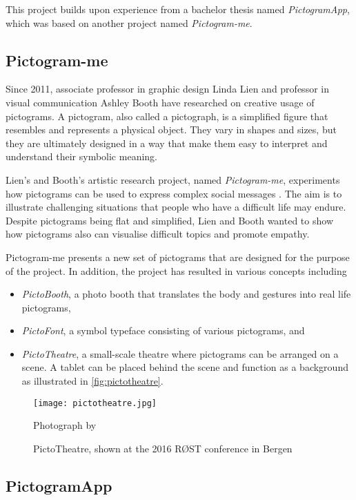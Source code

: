 This project builds upon experience from a bachelor thesis named \emph{PictogramApp}, which was based on another project named \emph{Pictogram-me}.

\subsection{Pictogram-me}

Since 2011, associate professor in graphic design Linda Lien and professor in visual communication Ashley Booth have researched on creative usage of pictograms. A pictogram, also called a pictograph, is a simplified figure that resembles and represents a physical object. They vary in shapes and sizes, but they are ultimately designed in a way that make them easy to interpret and understand their symbolic meaning.

Lien's and Booth's artistic research project, named \emph{Pictogram-me}, experiments how pictograms can be used to express complex social messages \parencite{lien2018}. The aim is to illustrate challenging situations that people who have a difficult life may endure. Despite pictograms being flat and simplified, Lien and Booth wanted to show how pictograms also can visualise difficult topics and promote empathy.

Pictogram-me presents a new set of pictograms that are designed for the purpose of the project. In addition, the project has resulted in various concepts including

\begin{itemize}
    \item \emph{PictoBooth}, a photo booth that translates the body and gestures into real life pictograms,
    \item \emph{PictoFont}, a symbol typeface consisting of various pictograms, and
    \item \emph{PictoTheatre}, a small-scale theatre where pictograms can be arranged on a scene. A tablet can be placed behind the scene and function as a background as illustrated in \autoref{fig:pictotheatre}.
\end{itemize}

\begin{figure}
    \centering
    \texttt{[image: pictotheatre.jpg]}
    \caption{PictoTheatre, shown at the 2016 RØST conference in Bergen}
    Photograph by \textcite{lien2018}
    \label{fig:pictotheatre}
\end{figure}

\subsection{PictogramApp}

